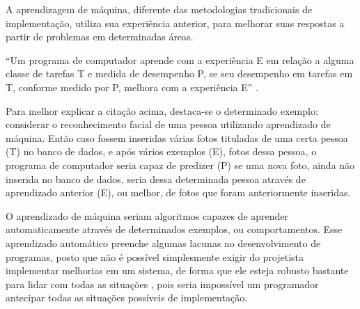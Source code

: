  A aprendizagem de máquina, diferente das metodologias tradicionais de implementação, utiliza sua experiência anterior, para melhorar suas respostas a partir de problemas em determinadas áreas. 
 
 ``Um programa de computador aprende com a experiência E em relação a alguma classe de tarefas T e medida de desempenho P, se seu desempenho em tarefas em T, conforme medido por P, melhora com a experiência E'' \cite[p. 2]{Mitchell1997}. 
 
 
Para melhor explicar a citação acima, destaca-se o determinado exemplo: considerar o reconhecimento facial de uma pessoa utilizando aprendizado de máquina. Então caso fossem  inseridas várias fotos tituladas de uma certa pessoa (T) no banco de dados, e após vários exemplos (E), fotos dessa pessoa, o programa de computador seria capaz de predizer (P) se uma nova foto, ainda não inserida no banco de dados, seria dessa  determinada pessoa através de aprendizado  anterior (E), ou melhor, de fotos que foram anteriormente inseridas.

O aprendizado de máquina seriam algoritmos capazes de aprender automaticamente através de  determinados exemplos, ou comportamentos. Esse aprendizado automático preenche algumas lacunas no desenvolvimento de programas, posto que não é possível simplesmente exigir do projetista implementar melhorias em um sistema, de forma que ele esteja robusto bastante para lidar com todas as situações \cite{RusselStuart.Norvig2013}, pois seria impossível um programador antecipar todas as situações possíveis de implementação.



